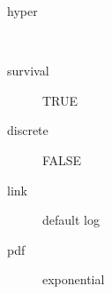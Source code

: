 \begin{description}
	\item[hyper]\ 
	 \item[ survival ] TRUE 
	 \item[ discrete ] FALSE 
	 \item[ link ] default log 
	 \item[ pdf ] exponential 
\end{description}
